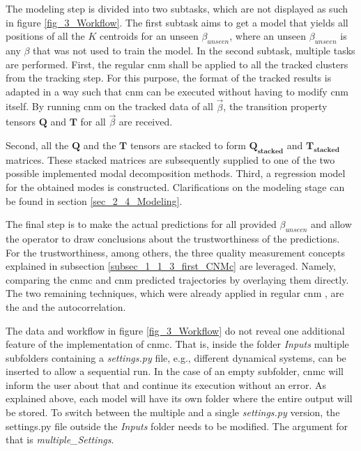 The modeling step is divided into two subtasks, which are not displayed as such in figure \ref{fig_3_Workflow}. The first subtask aims to get a model that yields all positions of all the $K$ centroids for an unseen $\beta_{unseen}$, where an unseen $\beta_{unseen}$ is any $\beta$ that was not used to train the model. In the second subtask, multiple tasks are performed. 
First, the regular \gls{cnm} \cite{Fernex2021} shall be applied to all the tracked clusters from the tracking step. For this purpose, the format of the tracked results is adapted in a way such that \gls{cnm} can be executed without having to modify \gls{cnm} itself. By running \gls{cnm} on the tracked data of all $\vec{\beta }$, the transition property tensors $\bm Q$ and $\bm T$ for all $\vec{\beta }$ are received. \newline 

Second, all the $\bm Q$ and the $\bm T$ tensors are stacked to form $\bm {Q_{stacked}}$ and $\bm {T_{stacked}}$ matrices. 
These stacked matrices are subsequently supplied to one of the two possible implemented modal decomposition methods. 
Third, a regression model for the obtained modes is constructed. 
Clarifications on the modeling stage can be found in section \ref{sec_2_4_Modeling}.\newline

The final step is to make the actual predictions for all provided $\beta_{unseen}$ and allow the operator to draw conclusions about the trustworthiness of the predictions. 
For the trustworthiness, among others, the three quality measurement concepts explained in subsection 
\ref{subsec_1_1_3_first_CNMc} 
are leveraged. Namely, comparing the \gls{cnmc} and \gls{cnm} predicted trajectories by overlaying them directly. The two remaining techniques, which were already applied in regular \gls{cnm} \cite{Fernex2021}, are the  and the autocorrelation.\newline 

The data and workflow in figure \ref{fig_3_Workflow} do not reveal one additional feature of the implementation of \gls{cnmc}. That is, inside the folder \emph{Inputs} multiple subfolders containing a \emph{settings.py} file, e.g., different dynamical systems, can be inserted to allow a sequential run. In the case of an empty subfolder, \gls{cnmc} will inform the user about that and continue its execution without an error. 
As explained above, each model will have its own folder where the entire output will be stored. 
To switch between the multiple and a single \emph{settings.py} version, the {settings.py} file outside the \emph{Inputs} folder needs to be modified. The argument for that is \emph{multiple\_Settings}.\newline 

